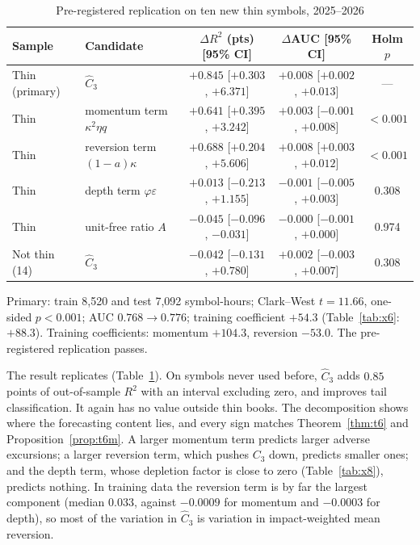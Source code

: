 \documentclass[12pt]{article}
\theoremstyle{definition}
\theoremstyle{remark}
\begin{document}
\begin{table}[t]\centering
\begin{threeparttable}
\caption{Pre-registered replication on ten new thin symbols, 2025--2026}\label{tab:y6}
\small\setlength{\tabcolsep}{4pt}
\begin{tabular}{llccc}
\toprule
Sample & Candidate & $\Delta R^2$ (pts) [95\% CI] & $\Delta$AUC [95\% CI] & Holm $p$\\
\midrule
Thin (primary) & $\hat C_3$ & $+0.845$ [$+0.303$, $+6.371$] & $+0.008$ [$+0.002$, $+0.013$] & ---\\
Thin & momentum term $\kappa^2\eta q$ & $+0.641$ [$+0.395$, $+3.242$] & $+0.003$ [$-0.001$, $+0.008$] & $<0.001$\\
Thin & reversion term $(1-a)\kappa$ & $+0.688$ [$+0.204$, $+5.606$] & $+0.008$ [$+0.003$, $+0.012$] & $<0.001$\\
Thin & depth term $\varphi\varepsilon$ & $+0.013$ [$-0.213$, $+1.155$] & $-0.001$ [$-0.005$, $+0.003$] & 0.308\\
Thin & unit-free ratio $A$ & $-0.045$ [$-0.096$, $-0.031$] & $-0.000$ [$-0.001$, $+0.000$] & 0.974\\
Not thin (14) & $\hat C_3$ & $-0.042$ [$-0.131$, $+0.780$] & $+0.002$ [$-0.003$, $+0.007$] & 0.308\\
\bottomrule
\end{tabular}
\begin{tablenotes}\footnotesize\item Primary: train 8{,}520 and test 7{,}092 symbol-hours; Clark--West $t=11.66$, one-sided $p<0.001$; AUC $0.768\to0.776$; training coefficient $+54.3$ (Table~\ref{tab:x6}: $+88.3$). Training coefficients: momentum $+104.3$, reversion $-53.0$. The pre-registered replication passes. \end{tablenotes}
\end{threeparttable}
\end{table}

The result replicates (Table~\ref{tab:y6}). On symbols never used before, $\hat C_3$ adds $0.85$ points of out-of-sample $R^2$ with an interval excluding zero, and improves tail classification. It again has no value outside thin books. The decomposition shows where the forecasting content lies, and every sign matches Theorem~\ref{thm:t6} and Proposition~\ref{prop:t6m}. A larger momentum term predicts larger adverse excursions; a larger reversion term, which pushes $C_3$ down, predicts smaller ones; and the depth term, whose depletion factor is close to zero (Table~\ref{tab:x8}), predicts nothing. In training data the reversion term is by far the largest component (median $0.033$, against $-0.0009$ for momentum and $-0.0003$ for depth), so most of the variation in $\hat C_3$ is variation in impact-weighted mean reversion.
\end{document}

